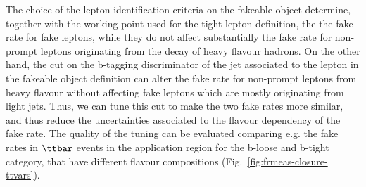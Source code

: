 The choice of the lepton identification criteria on the fakeable object determine, together with the working point used for the tight lepton definition, the the fake rate for fake leptons, while they do not affect substantially the fake rate for non-prompt leptons originating from the decay of heavy flavour hadrons. On the other hand, the cut on the b-tagging discriminator of the jet associated to the lepton in the fakeable object definition can alter the fake rate for non-prompt leptons from heavy flavour without affecting fake leptons which are mostly originating from light jets. Thus, we can tune this cut to make the two fake rates more similar, and thus reduce the uncertainties associated to the flavour dependency of the fake rate. The quality of the tuning can be evaluated comparing e.g. the fake rates in $\ttbar$ events in the application region for the b-loose and b-tight category, that have different flavour compositions (Fig.~\ref{fig:frmeas-closure-ttvars}).
